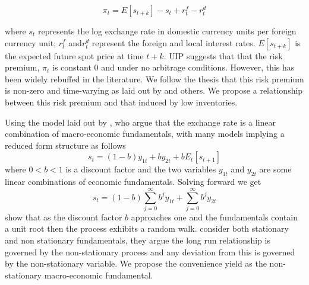 \begin{equation}
 \label{eq:uip}
 \pi_t = E[s_{t+k}] - s_t + r^{f}_t -r^{d}_t
\end{equation}

where $s_t$ represents the log exchange rate in domestic currency
units per foreign currency unit; $r^{f}_t$ and$r^{d}_t$ represent the foreign and local interest rates. $E[s_{t+k}]$ is the expected future spot price at time $t+k$. UIP suggests that that the risk premium, $\pi_t$ is constant 0 and under no arbitrage conditions. However, this has been widely rebuffed in the literature. We follow the thesis that this risk premium is non-zero and time-varying as laid out by \cite{currencyriskpremium} and others. We propose a relationship between this risk premium and that induced by low inventories.

Using the model laid out by \cite{engel}, who argue that the exchange rate is a linear combination of macro-economic fundamentals, with many models implying a reduced form structure as follows 
\begin{equation}
 s_t = (1 - b) y_{1t} + by_{2t} + b E_t[s_{t+1}]
\end{equation}
where $0 < b < 1$ is a discount factor and the two variables $y_{1t}$ and $y_{2t}$ are some linear combinations of economic fundamentals. Solving forward we get
\begin{equation}
 s_t = (1-b) \sum_{j=0}^{\infty}b^jy_{1t} + \sum_{j=0}^{\infty}b^jy_{2t}
\end{equation}
\cite{engel} show that as the discount factor $b$ approaches one and the fundamentals contain a unit root then the process exhibits a random walk. \cite{engel} consider both stationary and non stationary fundamentals, they argue the long run relationship is governed by the non-stationary process and any deviation from this is governed by the non-stationary variable. We propose the convenience yield as the non-stationary macro-economic fundamental. 

